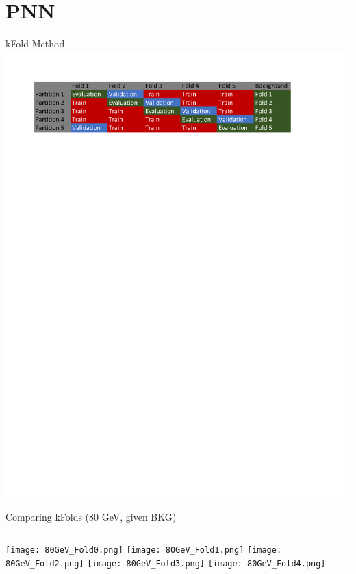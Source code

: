 \documentclass[aspectratio=169,xcolor=table]{beamer}
\begin{document}
  \section{PNN }

    \begin{frame}{kFold Method}
      \centering
      \includegraphics[width=\linewidth,keepaspectratio=true]{kFoldDiagram.pdf}
    \end{frame}

    \begin{frame}[t]{Comparing kFolds (80 GeV, given BKG)}
      \centering
      \begin{columns}
        \texttt{[image: 80GeV\_Fold0.png]}
        \texttt{[image: 80GeV\_Fold1.png]}
        \texttt{[image: 80GeV\_Fold2.png]}
        \texttt{[image: 80GeV\_Fold3.png]}
        \texttt{[image: 80GeV\_Fold4.png]}

      \end{columns}
    \end{frame}
\end{document}
